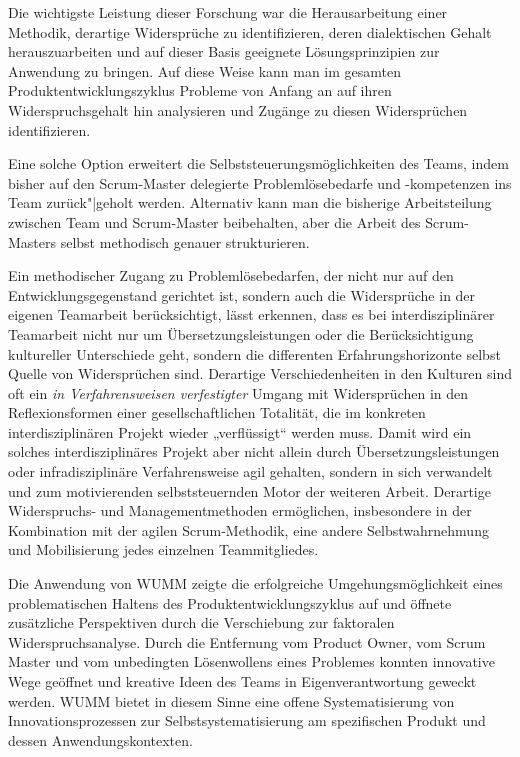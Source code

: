 \documentclass[a4paper,11pt]{article}
\begin{document}
Die wichtigste Leistung dieser Forschung war die Herausarbeitung einer
Methodik, derartige Widersprüche zu identifizieren, deren dialektischen Gehalt
herauszuarbeiten und auf dieser Basis geeignete Lösungsprinzipien zur
Anwendung zu bringen. Auf diese Weise kann man im gesamten
Produktentwicklungszyklus Probleme von Anfang an auf ihren Widerspruchsgehalt
hin analysieren und Zugänge zu diesen Widersprüchen identifizieren.

Eine solche Option erweitert die Selbststeuerungsmöglichkeiten des Teams,
indem bisher auf den Scrum-Master delegierte Problemlösebedarfe und
-kompetenzen ins Team zurück"|geholt werden. Alternativ kann man die bisherige
Arbeitsteilung zwischen Team und Scrum-Master beibehalten, aber die Arbeit des
Scrum-Masters selbst methodisch genauer strukturieren.

Ein methodischer Zugang zu Problemlösebedarfen, der nicht nur auf den
Entwicklungsgegenstand gerichtet ist, sondern auch die Widersprüche in der
eigenen Teamarbeit berücksichtigt, lässt erkennen, dass es bei
interdisziplinärer Teamarbeit nicht nur um Übersetzungsleistungen oder die
Berücksichtigung kultureller Unterschiede geht, sondern die differenten
Erfahrungshorizonte selbst Quelle von Widersprüchen sind.  Derartige
Verschiedenheiten in den Kulturen sind oft ein \emph{in Verfahrensweisen
  verfestigter} Umgang mit Widersprüchen in den Reflexionsformen einer
gesellschaftlichen Totalität, die im konkreten interdisziplinären Projekt
wieder „verflüssigt“ werden muss.  Damit wird ein solches interdisziplinäres
Projekt aber nicht allein durch Übersetzungsleistungen oder infradisziplinäre
Verfahrensweise agil gehalten, sondern in sich verwandelt und zum
motivierenden selbststeuernden Motor der weiteren Arbeit. Derartige
Widerspruchs- und Managementmethoden ermöglichen, insbesondere in der
Kombination mit der agilen Scrum-Methodik, eine andere Selbstwahrnehmung und
Mobilisierung jedes einzelnen Teammitgliedes.

Die Anwendung von WUMM zeigte die erfolgreiche Umgehungsmöglichkeit eines
problematischen Haltens des Produktentwicklungszyklus auf und öffnete
zusätzliche Perspektiven durch die Verschiebung zur faktoralen
Widerspruchsanalyse. Durch die Entfernung vom Product Owner, vom Scrum Master
und vom unbedingten Lösenwollens eines Problemes konnten innovative Wege
geöffnet und kreative Ideen des Teams in Eigenverantwortung geweckt werden.
WUMM bietet in diesem Sinne eine offene Systematisierung von
Innovationsprozessen zur Selbstsystematisierung am spezifischen Produkt und
dessen Anwendungskontexten.
\end{document}
